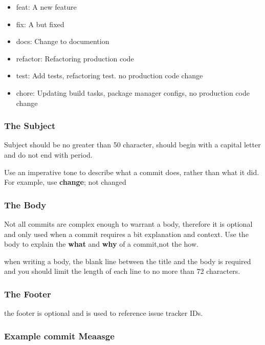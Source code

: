 \documentclass[11pt]{article}
\begin{document}
\begin{itemize}
\item feat: A new feature
\item fix: A but fixed
\item docs: Change to documention
\item refactor: Refactoring production code
\item test: Add tests, refactoring test. no production code change
\item chore: Updating build  tasks, package manager configs, no production code change
\end{itemize}

\subsubsection{The Subject}
\label{sec:org8d4db7b}
Subject should be no  greater than 50  character, should begin with a capital letter and do not end with period.

Use an imperative tone to describe what a commit does, rather than what it did. For example, use \textbf{change}; not changed

\subsubsection{The Body}
\label{sec:org837d8bb}
Not all commits are complex enough to warrant a body, therefore it is optional and only used when a commit requires a bit explanation and context. Use the body to explain the \textbf{what} and \textbf{why} of a commit,not the how.

when writing a body, the blank line between the title and the body is required and you should limit the length of each line to no more than 72 characters.

\subsubsection{The Footer}
\label{sec:org7fc6a86}
the footer is optional and is used to reference issue tracker IDs.

\subsubsection{Example commit Meaasge}
\label{sec:orgcb94d06}
\end{document}

